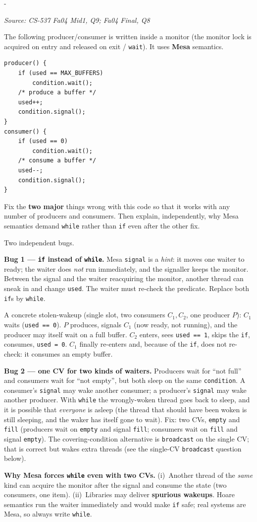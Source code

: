 \documentclass[11pt,a4paper]{article}
\makeatletter
\newcommand{\keepspace}[1]{\par\penalty-100\begingroup
  \setlength{\dimen@}{#1}\dimen@ii\pagegoal\advance\dimen@ii-\pagetotal
  \ifdim\dimen@>\dimen@ii\ifdim\dimen@ii>\z@\vfil\fi\break\fi\endgroup}
\newcounter{qn}[section]
\newenvironment{Qn}[4]{%
  \refstepcounter{qn}\keepspace{7\baselineskip}%
  \begin{tcolorbox}[qboxstyle, title={Q\thesection.\theqn\ \ [#1 \textbar\ #2]\ \ #4}]%
  {\footnotesize\color{g3}\textit{Source: #3}}\par\smallskip%
}{%
  \end{tcolorbox}%
}
\newenvironment{Sol}{%
  \begin{tcolorbox}[sboxstyle, title={Solution}]%
}{%
  \end{tcolorbox}\vspace{0.35em}%
}
\makeatother
\begin{document}
\begin{Qn}{Hard}{Lect 18}{CS-537 Fa04 Mid1, Q9; Fa04 Final, Q8}{Mesa semantics: two things wrong in a monitor producer/consumer}
The following producer/consumer is written inside a monitor (the monitor
lock is acquired on entry and released on exit / \texttt{wait}). It uses
\textbf{Mesa} semantics.
\begin{lstlisting}[numbers=none]
producer() {
    if (used == MAX_BUFFERS)
        condition.wait();
    /* produce a buffer */
    used++;
    condition.signal();
}
consumer() {
    if (used == 0)
        condition.wait();
    /* consume a buffer */
    used--;
    condition.signal();
}
\end{lstlisting}
Fix the \textbf{two major} things wrong with this code so that it works
with any number of producers and consumers. Then explain, independently,
why Mesa semantics demand \texttt{while} rather than \texttt{if} even
after the other fix.
\end{Qn}
\begin{Sol}
Two independent bugs.

\textbf{Bug 1 --- \texttt{if} instead of \texttt{while}.}
Mesa \texttt{signal} is a \emph{hint}: it moves one waiter to ready; the
waiter does \emph{not} run immediately, and the signaller keeps the
monitor. Between the signal and the waiter reacquiring the monitor,
another thread can sneak in and change \texttt{used}. The waiter must
re-check the predicate. Replace both \texttt{if}s by
\texttt{while}.

A concrete stolen-wakeup (single slot, two consumers $C_1,C_2$, one
producer $P$): $C_1$ waits (\texttt{used == 0}). $P$ produces, signals
$C_1$ (now ready, not running), and the producer may itself wait on a
full buffer. $C_2$ enters, sees \texttt{used == 1}, skips the
\texttt{if}, consumes, \texttt{used = 0}. $C_1$ finally re-enters and,
because of the \texttt{if}, does not re-check: it consumes an empty
buffer.

\textbf{Bug 2 --- one CV for two kinds of waiters.}
Producers wait for ``not full'' and consumers wait for ``not empty'',
but both sleep on the same \texttt{condition}. A consumer's
\texttt{signal} may wake another consumer; a producer's \texttt{signal}
may wake another producer. With \texttt{while} the wrongly-woken thread
goes back to sleep, and it is possible that \emph{everyone} is asleep
(the thread that should have been woken is still sleeping, and the
waker has itself gone to wait). Fix: two CVs, \texttt{empty} and
\texttt{fill} (producers wait on \texttt{empty} and signal
\texttt{fill}; consumers wait on \texttt{fill} and signal
\texttt{empty}). The covering-condition alternative is
\texttt{broadcast} on the single CV; that is correct but wakes extra
threads (see the single-CV \texttt{broadcast} question below).

\textbf{Why Mesa forces \texttt{while} even with two CVs.}
(i)~Another thread of the \emph{same} kind can acquire the monitor
after the signal and consume the state (two consumers, one item).
(ii)~Libraries may deliver \textbf{spurious wakeups}. Hoare semantics
run the waiter immediately and would make \texttt{if} safe; real
systems are Mesa, so always write \texttt{while}.
\end{Sol}
\end{document}
